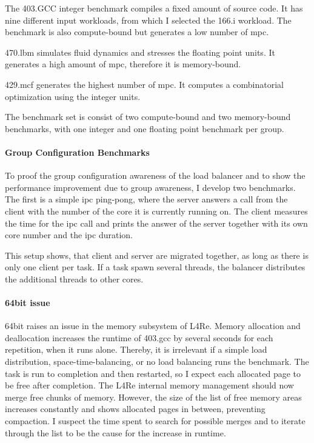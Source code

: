 The 403.GCC integer benchmark compiles a fixed amount of source code.
It has nine different input workloads, from which I selected the 166.i
workload.
The benchmark is also compute-bound but generates a low number of \gls{mpc}.

470.lbm simulates fluid dynamics and stresses the floating point units.
It generates a high amount of \gls{mpc}, therefore it is memory-bound.

429.mcf generates the highest number of \gls{mpc}.
It computes a combinatorial optimization using the integer units.

The benchmark set is consist of two compute-bound and two memory-bound
benchmarks, with one integer and one floating point benchmark per group.

\paragraph{Group Configuration Benchmarks}
To proof the group configuration awareness of the load balancer and to show the
performance improvement due to group awareness, I develop two benchmarks.
The first is a simple \gls{ipc} ping-pong, where the server answers a call from
the client with the number of the core it is currently running on.
The client measures the time for the \gls{ipc} call and prints the answer of
the server together with its own core number and the \gls{ipc} duration.

This setup shows, that client and server are migrated together, as long as
there is only one client per task.
If a task spawn several threads, the balancer distributes the additional
threads to other cores.



\paragraph{64bit issue}
64bit raises an issue in the memory subsystem of L4Re.
Memory allocation and deallocation increases the runtime of 403.gcc by several
seconds for each repetition, when it runs alone.
Thereby, it is irrelevant if a simple load distribution, space-time-balancing,
or no load balancing runs the benchmark.
The task is run to completion and then restarted, so I expect each allocated
page to be free after completion.
The L4Re internal memory management should now merge free chunks of memory.
However, the size of the list of free memory areas increases constantly and
shows allocated pages in between, preventing compaction.
I suspect the time spent to search for possible merges and to iterate through
the list to be the cause for the increase in runtime.


